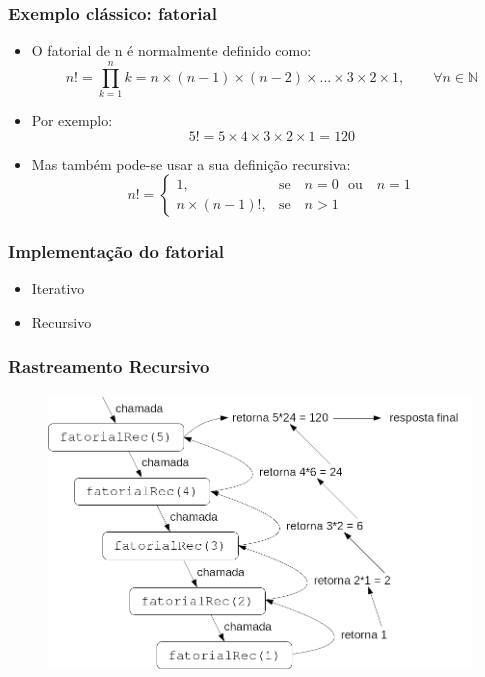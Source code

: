\documentclass[aspectratio=169]{beamer}
\begin{document}
\begin{frame}\frametitle{Exemplo clássico: fatorial}
\begin{itemize}
	\item O fatorial de n é normalmente definido como:
\[ n! = \prod_{k=1}^{n}{k} = n \times (n-1) \times (n-2) \times ... \times 3 \times 2 \times 1,\qquad \forall n \in \mathbb{N}\]
	\item Por exemplo:
\[5 ! = 5 \times 4 \times 3 \times 2 \times 1 = 120\]
	\item Mas também pode-se usar a sua definição recursiva:
\[ n! = \begin{cases}
1, & \mbox{se ~ } n=0 \mbox{~ ou ~ } n=1\\
n \times (n-1)!, & \mbox{se ~ } n > 1
\end{cases} \]
\end{itemize}
\end{frame}

\begin{frame}[fragile]\frametitle{Implementação do fatorial}
\begin{itemize}
	\item Iterativo
{\scriptsize}
	\item Recursivo
{\scriptsize}
	\end{itemize}
\end{frame}

\begin{frame}\frametitle{Rastreamento Recursivo}
\begin{figure}[h]
	\centering
	\includegraphics[height=0.7\paperheight]{imagens/rastreamento_recursivo.png}
\end{figure}
\end{frame}
\end{document}
